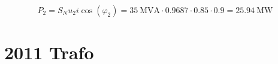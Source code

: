 \documentclass[11pt,a4paper]{scrartcl}
\newcommand{\mybr}[1]{\left(#1\right)}
\newcommand{\0}{_{\mybr{0}}}
\newcommand{\1}{_{\mybr{1}}}
\newcommand{\2}{_{\mybr{2}}}
\newcommand{\cz}{\cos\mybr{\varphi_2}}
\begin{document}
\subsection{}
\begin{equation}
P_2=S_N u_2 i \cz=\SI{35}{\mega\volt\ampere}\cdot\num{0.9687}\cdot\num{0.85}\cdot\num{0.9}=\SI{25.94}{\mega\watt}
\end{equation}

\clearpage
\part{2011 Trafo}
\section{}
\end{document}
